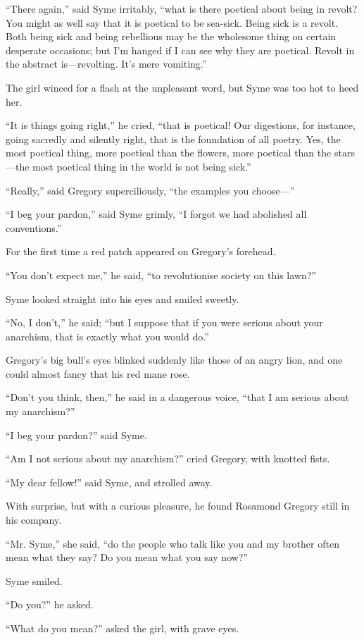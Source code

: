 \documentclass{book}
\begin{document}
“There again,” said Syme irritably, “what is there poetical about being in revolt? You might as well say that it is poetical to be sea-sick. Being sick is a revolt. Both being sick and being rebellious may be the wholesome thing on certain desperate occasions; but I’m hanged if I can see why they are poetical. Revolt in the abstract is—revolting. It’s mere vomiting.”

The girl winced for a flash at the unpleasant word, but Syme was too hot to heed her.

“It is things going right,” he cried, “that is poetical! Our digestions, for instance, going sacredly and silently right, that is the foundation of all poetry. Yes, the most poetical thing, more poetical than the flowers, more poetical than the stars—the most poetical thing in the world is not being sick.”

“Really,” said Gregory superciliously, “the examples you choose—”

“I beg your pardon,” said Syme grimly, “I forgot we had abolished all conventions.”

For the first time a red patch appeared on Gregory’s forehead.

“You don’t expect me,” he said, “to revolutionise society on this lawn?”

Syme looked straight into his eyes and smiled sweetly.

“No, I don’t,” he said; “but I suppose that if you were serious about your anarchism, that is exactly what you would do.”

Gregory’s big bull’s eyes blinked suddenly like those of an angry lion, and one could almost fancy that his red mane rose.

“Don’t you think, then,” he said in a dangerous voice, “that I am serious about my anarchism?”

“I beg your pardon?” said Syme.

“Am I not serious about my anarchism?” cried Gregory, with knotted fists.

“My dear fellow!” said Syme, and strolled away.

With surprise, but with a curious pleasure, he found Rosamond Gregory still in his company.

“Mr. Syme,” she said, “do the people who talk like you and my brother often mean what they say? Do you mean what you say now?”

Syme smiled.

“Do you?” he asked.

“What do you mean?” asked the girl, with grave eyes.
\end{document}
